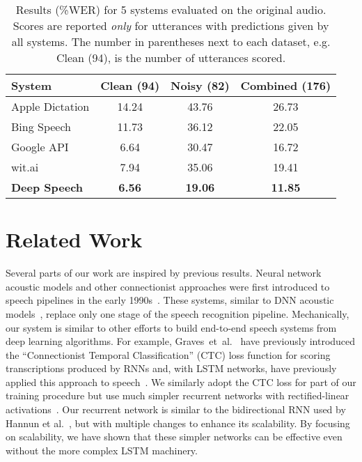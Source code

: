 \documentclass{article}
\begin{document}
\begin{table}[ht!]
\centering
\begin{tabular}{l  c  c  c}
\toprule
System      &  Clean (94) &  Noisy (82) & Combined (176) \\
\midrule
Apple Dictation  & 14.24   & 43.76  & 26.73 \\
Bing Speech      &  11.73     &   36.12   &  22.05   \\
Google API       &  6.64   & 30.47  & 16.72 \\
wit.ai           &  7.94   & 35.06  & 19.41 \\
{\bf Deep Speech}       &  {\bf 6.56}   & {\bf 19.06}  & {\bf 11.85} \\
\bottomrule
\end{tabular}
\caption{Results (\%WER) for 5 systems evaluated on the original audio. Scores are reported {\it only} for utterances with predictions given by all systems. The number in parentheses next to each dataset, e.g. Clean (94), is the number of utterances scored.}
\label{table:originalaudio}
\end{table}


\section{Related Work}
\label{section:related}

Several parts of our work are inspired by previous results. Neural network
acoustic models and other connectionist approaches were first introduced to
speech pipelines in the early 1990s~\cite{Bourlard93, Renals1994, Ellis1999}.
These systems, similar to DNN acoustic
models~\cite{Mohamed2011,Hinton2012,Dahl2011a}, replace only one stage of the
speech recognition pipeline.  Mechanically, our system is similar to other
efforts to build end-to-end speech systems from deep learning algorithms.  For
example, Graves~et~al.~\cite{Graves2006} have previously introduced the
``Connectionist Temporal Classification'' (CTC) loss function for scoring
transcriptions produced by RNNs and, with LSTM networks, have previously
applied this approach to speech~\cite{Graves2014}.  We similarly adopt the CTC
loss for part of our training procedure but use much simpler recurrent networks
with rectified-linear
activations~\cite{glorot2011deep,Maas2013,nair2010relurbm}.   Our recurrent
network is similar to the bidirectional RNN used by Hannun et
al.~\cite{hannun2014firstpass}, but with multiple changes to enhance its
scalability. By focusing on scalability, we have shown that these simpler
networks can be effective even without the more complex LSTM machinery.
\end{document}
